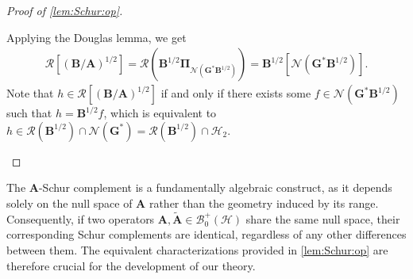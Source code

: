 \documentclass[noinfoline]{imsart}\setcounter{tocdepth}{2}
\newcommand{\m}[1]{\mathbf{#1}} %
\renewcommand{\c}[1]{\mathcal{#1}} %
\theoremstyle{plain}
\begin{document}
\begin{proof}[Proof of \cref{lem:Schur:op}]
\begin{enumerate}[leftmargin=*]
Applying the Douglas lemma, we get
\begin{align*}
    \c{R}[(\m{B}/\m{A})^{1/2}] =
    \c{R}( \m{B}^{1/2}\m{\Pi}_{\c{N}(\m{G}^{*} \m{B}^{1/2})} ) = \m{B}^{1/2} [\c{N}(\m{G}^{*} \m{B}^{1/2})].
\end{align*}
Note that $h \in \c{R}[(\m{B}/\m{A})^{1/2}]$ if and only if there exists some $f \in \c{N}(\m{G}^{*} \m{B}^{1/2})$ such that $h = \m{B}^{1/2} f$, which is equivalent to $h \in \c{R}(\m{B}^{1/2}) \cap \c{N}(\m{G}^{*}) = \c{R}(\m{B}^{1/2}) \cap \c{H}_{2}$.
\end{enumerate}
\end{proof}

The $\m{A}$-Schur complement is a fundamentally algebraic construct, as it depends solely on the null space of $\m{A}$ rather than the geometry induced by its range. Consequently, if two operators $\m{A}, \tilde{\m{A}} \in \c{B}_{0}^{+}(\c{H})$ share the same null space, their corresponding Schur complements are identical, regardless of any other differences between them. The equivalent characterizations provided in \cref{lem:Schur:op} are therefore crucial for the development of our theory.

\end{document}
